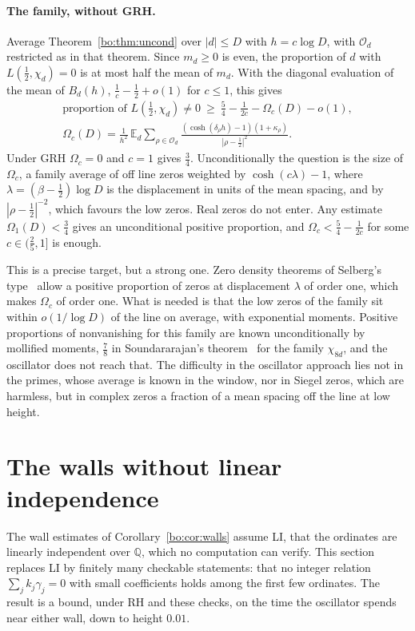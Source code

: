 \paragraph{The family, without GRH.} Average Theorem~\ref{bo:thm:uncond} over $|d|\le D$ with $h=c\log D$, with $\mathcal O_d$ restricted as in that theorem. Since $m_d\ge0$ is even, the proportion of $d$ with $L(\frac12,\chi_d)=0$ is at most half the mean of $m_d$. With the diagonal evaluation of the mean of $B_d(h)$, $\frac1c-\frac12+o(1)$ for $c\le1$, this gives
\begin{gather*}
\text{proportion of }L(\tfrac12,\chi_d)\ne0\ \ge\ \frac54-\frac1{2c}-\Omega_c(D)-o(1),\\
\Omega_c(D)=\frac1{h^2}\,\mathbb E_d\sum_{\rho\in\mathcal O_d}\frac{(\cosh(\delta_\rho h)-1)(1+\kappa_\rho)}{|\rho-\frac12|^2}.
\end{gather*}
Under GRH $\Omega_c=0$ and $c=1$ gives $\frac34$. Unconditionally the question is the size of $\Omega_c$, a family average of off line zeros weighted by $\cosh(c\lambda)-1$, where $\lambda=(\beta-\frac12)\log D$ is the displacement in units of the mean spacing, and by $|\rho-\frac12|^{-2}$, which favours the low zeros. Real zeros do not enter. Any estimate $\Omega_1(D)<\frac34$ gives an unconditional positive proportion, and $\Omega_c<\frac54-\frac1{2c}$ for some $c\in(\frac25,1]$ is enough.

This is a precise target, but a strong one. Zero density theorems of Selberg's type~\cite{Selberg46} allow a positive proportion of zeros at displacement $\lambda$ of order one, which makes $\Omega_c$ of order one. What is needed is that the low zeros of the family sit within $o(1/\log D)$ of the line on average, with exponential moments. Positive proportions of nonvanishing for this family are known unconditionally by mollified moments, $\frac78$ in Soundararajan's theorem~\cite{Soundararajan00} for the family $\chi_{8d}$, and the oscillator does not reach that. The difficulty in the oscillator approach lies not in the primes, whose average is known in the window, nor in Siegel zeros, which are harmless, but in complex zeros a fraction of a mean spacing off the line at low height.

\section{The walls without linear independence}\label{bo:sec:oscwalls}

The wall estimates of Corollary~\ref{bo:cor:walls} assume LI, that the ordinates are linearly independent over $\mathbb Q$, which no computation can verify. This section replaces LI by finitely many checkable statements: that no integer relation $\sum_jk_j\gamma_j=0$ with small coefficients holds among the first few ordinates. The result is a bound, under RH and these checks, on the time the oscillator spends near either wall, down to height $0.01$.

